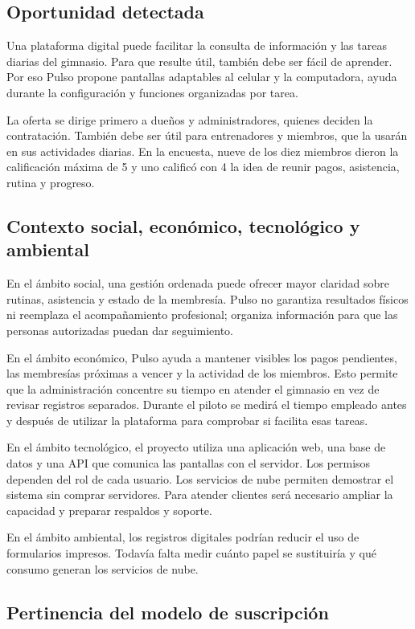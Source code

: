 \subsection{Oportunidad detectada}

Una plataforma digital puede facilitar la consulta de información y las tareas
diarias del gimnasio. Para que resulte útil, también debe ser fácil de aprender.
Por eso Pulso propone pantallas adaptables al celular y la computadora, ayuda
durante la configuración y funciones organizadas por tarea.

La oferta se dirige primero a dueños y administradores, quienes deciden la
contratación. También debe ser útil para entrenadores y miembros, que la usarán
en sus actividades diarias. En la encuesta, nueve de los diez miembros dieron
la calificación máxima de 5 y uno calificó con 4 la idea de reunir pagos,
asistencia, rutina y progreso.

\subsection{Contexto social, económico, tecnológico y ambiental}

En el ámbito social, una gestión ordenada puede ofrecer mayor claridad sobre
rutinas, asistencia y estado de la membresía. Pulso no garantiza resultados
físicos ni reemplaza el acompañamiento profesional; organiza información para
que las personas autorizadas puedan dar seguimiento.

En el ámbito económico, Pulso ayuda a mantener visibles los pagos pendientes,
las membresías próximas a vencer y la actividad de los miembros. Esto permite que
la administración concentre su tiempo en atender el gimnasio en vez de revisar
registros separados. Durante el piloto se medirá el tiempo empleado antes y
después de utilizar la plataforma para comprobar si facilita esas tareas.

En el ámbito tecnológico, el proyecto utiliza una aplicación web, una base de
datos y una API que comunica las pantallas con el servidor. Los permisos
dependen del rol de cada usuario. Los servicios de nube permiten demostrar el
sistema sin comprar servidores. Para atender clientes será necesario ampliar
la capacidad y preparar respaldos y soporte.

En el ámbito ambiental, los registros digitales podrían reducir el uso de
formularios impresos. Todavía falta medir cuánto papel se sustituiría y qué
consumo generan los servicios de nube.

\subsection{Pertinencia del modelo de suscripción}

